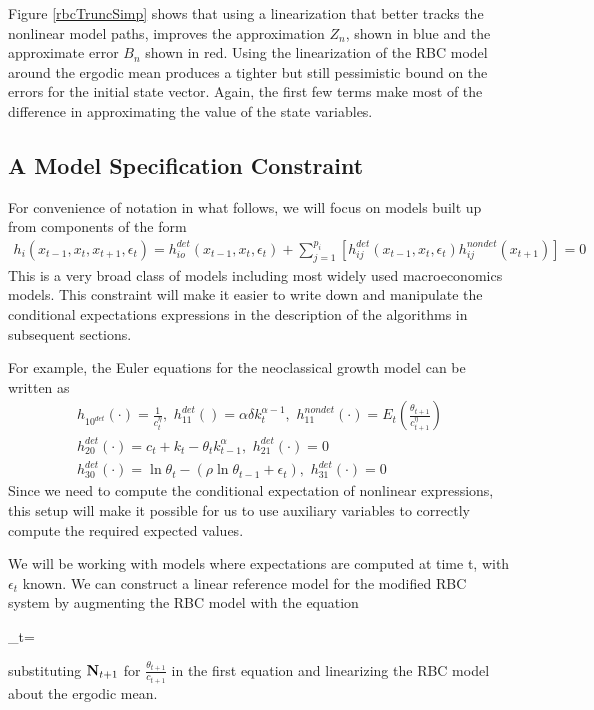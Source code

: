 \documentclass[12pt]{article}
\begin{document}
Figure \ref{rbcTruncSimp} shows that using a 
linearization that better tracks the 
nonlinear model paths, improves the approximation $Z_n$, shown in blue  and the approximate error  $B_n$ shown in red.
Using the linearization of the RBC model around the ergodic mean produces a tighter but still pessimistic bound on the errors for the initial state vector.
Again, the first few terms make most of the difference in approximating the value of the state variables.


\subsection{A Model Specification Constraint}
\label{sec:convenient}



For convenience of notation in what follows, 
we will focus on models built up from components of the form
\begin{gather}
  h_i(x_{t-1},x_{t},x_{t+1},\epsilon_t)=h^{det}_{io}(x_{t-1},x_{t},\epsilon_t)+\sum_{j=1}^{p_i} [h^{det}_{ij}(x_{t-1},x_{t},\epsilon_t)h^{nondet}_{ij}(x_{t+1})]=0
\end{gather}
This is a very broad class of models including most widely used
macroeconomics models.  This constraint will make it easier to write
down and manipulate the conditional expectations expressions in the
description of the algorithms in subsequent sections.

For example, the Euler equations for the  neoclassical growth  model 
\label{sec:simple-rbc-model-ext} can be written as
\begin{gather}
h_{10^{det}}(\cdot)=\frac{1}{c_t^\eta},\,\,
h_{11}^{det}()=\alpha \delta k_{t}^{\alpha-1} ,\,\,
h_{11}^{nondet}(\cdot)=E_t \left (\frac{\theta_{t+1}}{c_{t+1}^\eta} \right )\\
h_{20}^{det}(\cdot)=c_t + k_t-\theta_tk_{t-1}^\alpha,\,\,
h_{21}^{det}(\cdot)=0\\
h_{30}^{det}(\cdot)=\ln \theta_t -(\rho \ln \theta_{t-1} + \epsilon_t),\,\,
h_{31}^{det}(\cdot)=0
\end{gather}
Since we   need to compute 
the conditional expectation of nonlinear expressions,  
this setup will make it possible for us to use auxiliary
variables to correctly compute the required expected values.

We will be working with models where expectations are computed at time t, with  $\epsilon_t$  known. 
We can construct a linear reference model for the modified RBC system
by  augmenting the RBC model with the equation 
\begin{tcolorbox}
  \rcpC_t=
\end{tcolorbox}
\noindent
substituting ${\mathbf{N}}_{t+1}$ for $\frac{\theta_{t+1}}{c_{t+1}}$ 
in the first equation and 
 linearizing the RBC model about the ergodic mean.
\end{document}
